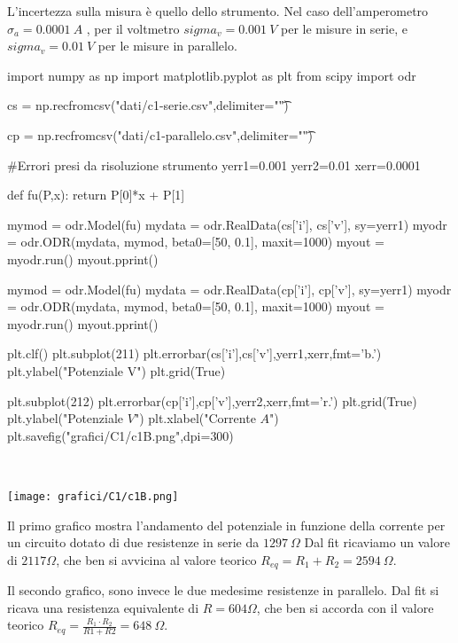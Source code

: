 L'incertezza sulla misura è quello dello strumento. Nel caso dell'amperometro $\sigma_a = 0.0001\ A$ , per il voltmetro
$sigma_v = 0.001\ V$ per le misure in serie, e $sigma_v = 0.01\ V$ per le misure in parallelo.
\\

\begin{sagesilent}
 
 import numpy as np
 import matplotlib.pyplot as plt
 from scipy import odr

 cs = np.recfromcsv("dati/c1-serie.csv",delimiter="\t")
 
 cp = np.recfromcsv("dati/c1-parallelo.csv",delimiter="\t")

 #Errori presi da risoluzione strumento
 yerr1=0.001
 yerr2=0.01
 xerr=0.0001
 
 def fu(P,x):
    return P[0]*x + P[1]

 mymod = odr.Model(fu)
 mydata = odr.RealData(cs['i'], cs['v'], sy=yerr1)
 myodr = odr.ODR(mydata, mymod, beta0=[50, 0.1], maxit=1000)
 myout = myodr.run()
 myout.pprint()
 
 mymod = odr.Model(fu)
 mydata = odr.RealData(cp['i'], cp['v'], sy=yerr1)
 myodr = odr.ODR(mydata, mymod, beta0=[50, 0.1], maxit=1000)
 myout = myodr.run()
 myout.pprint()

 plt.clf()
 plt.subplot(211)
 plt.errorbar(cs['i'],cs['v'],yerr1,xerr,fmt='b.')
 plt.ylabel("Potenziale V")
 plt.grid(True)
 
 plt.subplot(212)
 plt.errorbar(cp['i'],cp['v'],yerr2,xerr,fmt='r.')
 plt.grid(True)
 plt.ylabel("Potenziale $V$")
 plt.xlabel("Corrente $A$")
 plt.savefig("grafici/C1/c1B.png",dpi=300)
 
\end{sagesilent}


\


\texttt{[image: grafici/C1/c1B.png]}

Il primo grafico mostra l'andamento del potenziale in funzione della corrente per un circuito dotato di due resistenze in serie da $1297\ \Omega$
Dal fit ricaviamo un valore di $2117 \Omega$, che ben si avvicina al valore teorico $R_{eq}=R_1+R_2= 2594\ \Omega$.

Il secondo grafico, sono invece le due medesime resistenze in parallelo. Dal fit si ricava una resistenza equivalente di
$R = 604 \Omega$, che ben si accorda con il valore teorico $R_{eq} = \frac{R_1 \cdot R_2}{R1+R2}=648\ \Omega$.

